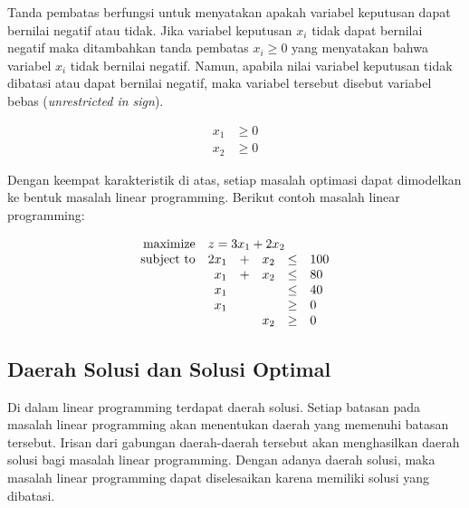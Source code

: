 \begin{itemize}
		Tanda pembatas berfungsi untuk menyatakan apakah variabel keputusan dapat bernilai negatif atau tidak. Jika variabel keputusan \(x_i\) tidak dapat bernilai negatif maka ditambahkan tanda pembatas \(x_i \geq 0\) yang menyatakan bahwa variabel \(x_i\) tidak bernilai negatif. Namun, apabila nilai variabel keputusan tidak dibatasi atau dapat bernilai negatif, maka variabel tersebut disebut variabel bebas (\textit{unrestricted in sign}).
		
		\begin{equation*}
			\begin{split}
    			x_1 &\geq 0 \\
    			x_2 &\geq 0
			\end{split}
		\end{equation*}
		
\end{itemize}

Dengan keempat karakteristik di atas, setiap masalah optimasi dapat dimodelkan ke bentuk masalah linear programming. Berikut contoh masalah linear programming:

\begin{equation*}
	\begin{array}{r r c r c l}
		\text{maximize} &\multicolumn{5}{l}{z = 3x_1 + 2x_2}\\
		\text{subject to} &2x_1 &+ &x_2 &\leq &100\\
		&x_1 &+ &x_2 &\leq &80\\
		&x_1 &&&\leq &40\\
		&x_1 &&&\geq &0\\
		&&&x_2 &\geq &0\\
	\end{array}
\end{equation*}

\subsection{Daerah Solusi dan Solusi Optimal}
\label{daerah_solusi_dan_solusi_optimal}

Di dalam linear programming terdapat daerah solusi. Setiap batasan pada masalah linear programming akan menentukan daerah yang memenuhi batasan tersebut. Irisan dari gabungan daerah-daerah tersebut akan menghasilkan daerah solusi bagi masalah linear programming. Dengan adanya daerah solusi, maka masalah linear programming dapat diselesaikan karena memiliki solusi yang dibatasi.


